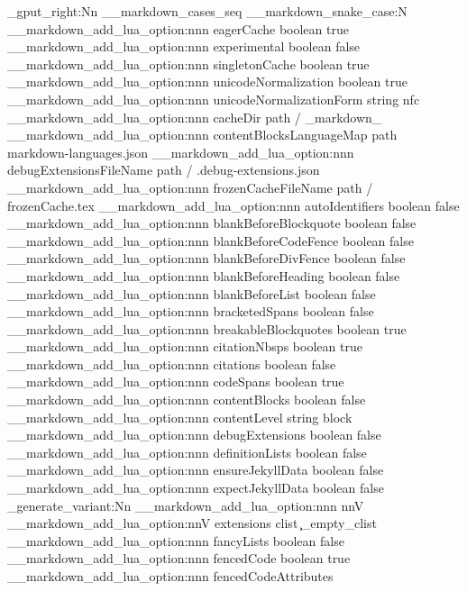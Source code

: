 \seq_gput_right:Nn \g__markdown_cases_seq { __markdown_snake_case:N }
\__markdown_add_lua_option:nnn
  { eagerCache }
  { boolean }
  { true }
\__markdown_add_lua_option:nnn
  { experimental }
  { boolean }
  { false }
\__markdown_add_lua_option:nnn
  { singletonCache }
  { boolean }
  { true }
\__markdown_add_lua_option:nnn
  { unicodeNormalization }
  { boolean }
  { true }
\__markdown_add_lua_option:nnn
  { unicodeNormalizationForm }
  { string }
  { nfc }
\__markdown_add_lua_option:nnn
  { cacheDir }
  { path }
  { \markdownOptionOutputDir / _markdown_\jobname }
\__markdown_add_lua_option:nnn
  { contentBlocksLanguageMap }
  { path }
  { markdown-languages.json }
\__markdown_add_lua_option:nnn
  { debugExtensionsFileName }
  { path }
  { \markdownOptionOutputDir / \jobname .debug-extensions.json }
\__markdown_add_lua_option:nnn
  { frozenCacheFileName }
  { path }
  { \markdownOptionCacheDir / frozenCache.tex }
\__markdown_add_lua_option:nnn
  { autoIdentifiers }
  { boolean }
  { false }
\__markdown_add_lua_option:nnn
  { blankBeforeBlockquote }
  { boolean }
  { false }
\__markdown_add_lua_option:nnn
  { blankBeforeCodeFence }
  { boolean }
  { false }
\__markdown_add_lua_option:nnn
  { blankBeforeDivFence }
  { boolean }
  { false }
\__markdown_add_lua_option:nnn
  { blankBeforeHeading }
  { boolean }
  { false }
\__markdown_add_lua_option:nnn
  { blankBeforeList }
  { boolean }
  { false }
\__markdown_add_lua_option:nnn
  { bracketedSpans }
  { boolean }
  { false }
\__markdown_add_lua_option:nnn
  { breakableBlockquotes }
  { boolean }
  { true }
\__markdown_add_lua_option:nnn
  { citationNbsps }
  { boolean }
  { true }
\__markdown_add_lua_option:nnn
  { citations }
  { boolean }
  { false }
\__markdown_add_lua_option:nnn
  { codeSpans }
  { boolean }
  { true }
\__markdown_add_lua_option:nnn
  { contentBlocks }
  { boolean }
  { false }
\__markdown_add_lua_option:nnn
  { contentLevel }
  { string }
  { block }
\__markdown_add_lua_option:nnn
  { debugExtensions }
  { boolean }
  { false }
\__markdown_add_lua_option:nnn
  { definitionLists }
  { boolean }
  { false }
\__markdown_add_lua_option:nnn
  { ensureJekyllData }
  { boolean }
  { false }
\__markdown_add_lua_option:nnn
  { expectJekyllData }
  { boolean }
  { false }
\cs_generate_variant:Nn
  \__markdown_add_lua_option:nnn
  { nnV }
\__markdown_add_lua_option:nnV
  { extensions }
  { clist }
  \c_empty_clist
\__markdown_add_lua_option:nnn
  { fancyLists }
  { boolean }
  { false }
\__markdown_add_lua_option:nnn
  { fencedCode }
  { boolean }
  { true }
\__markdown_add_lua_option:nnn
  { fencedCodeAttributes }
